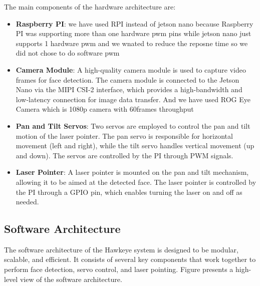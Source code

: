 \documentclass[a4paper,11pt]{article}%
\begin{document}
The main components of the hardware architecture are:
\begin{itemize}
    \item \textbf{Raspberry PI}: we have used RPI instead of jetson nano because Raspberry PI was supporting more than one hardware pwm pins while jetson nano just supports 1 hardware pwm and we wnated to reduce the reposne time so we did not chose to do software pwm

    \item \textbf{Camera Module}: A high-quality camera module is used to capture video frames for face detection. The camera module is connected to the Jetson Nano via the MIPI CSI-2 interface, which provides a high-bandwidth and low-latency connection for image data transfer. And we have used ROG Eye Camera which is 1080p camera with 60frames throughput



    \item \textbf{Pan and Tilt Servos}: Two servos are employed to control the pan and tilt motion of the laser pointer. The pan servo is responsible for horizontal movement (left and right), while the tilt servo handles vertical movement (up and down). The servos are controlled by the PI through PWM signals.


    \item \textbf{Laser Pointer}: A laser pointer is mounted on the pan and tilt mechanism, allowing it to be aimed at the detected face. The laser pointer is controlled by the PI through a GPIO pin, which enables turning the laser on and off as needed.


\end{itemize}

\subsection{Software Architecture}
The software architecture of the Hawkeye system is designed to be modular, scalable, and efficient. It consists of several key components that work together to perform face detection, servo control, and laser pointing. Figure presents a high-level view of the software architecture.
\end{document}
